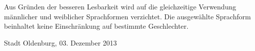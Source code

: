 \documentclass[10pt,a4paper,oneside,parskip=half]{scrartcl}
\begin{document}
\vspace{1cm}

Aus Gründen der besseren Lesbarkeit wird auf die gleichzeitige Verwendung männlicher und weiblicher Sprachformen verzichtet. Die ausgewählte Sprachform beinhaltet keine Einschränkung auf bestimmte Geschlechter.

\vspace{1cm}
Stadt Oldenburg, 03. Dezember 2013
\end{document}
